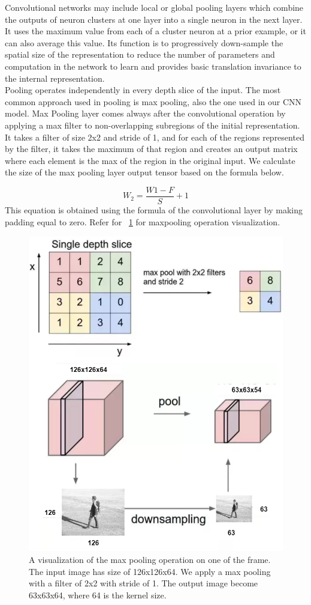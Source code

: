 Convolutional networks may include local or global pooling layers which combine the outputs of neuron clusters at one layer into a single neuron in the next layer. It uses the maximum value from each of a cluster neuron at a prior example, or it can also average this value. Its function is to progressively down-sample the spatial size of the representation to reduce the number of parameters and computation in the network to learn and provides basic translation invariance to the internal representation.\\

Pooling operates independently in every depth slice of the input. The most common approach used in pooling is max pooling, also the one used in our CNN model. Max Pooling layer comes always after the convolutional operation by applying a max filter to non-overlapping subregions of the initial representation. It takes a filter of size 2x2 and stride of 1, and for each of the regions represented by the filter, it takes the maximum of that region and creates an output matrix where each element is the max of the region in the original input. We calculate the size of the max pooling layer output tensor based on the formula below.

\begin{equation}
 W_{2}=\frac{W1-F}{S} +1
\end{equation}
This equation is obtained using the formula of the convolutional layer by making padding equal to zero. Refer for ~\ref{fig:maxpoolinglayervisualization} for maxpooling operation visualization.
\begin{figure}[ht]
\centering
\includegraphics[width=0.6\columnwidth]{Figures/mp3.png}
\decoRule
\caption[A visualization of the max pooling operation on one of the frame. The input image has size of 126x126x64. We apply a max pooling with a filter of 2x2 with stride of 1. The output image become 63x63x64, where 64 is the kernel size.]{A visualization of the max pooling operation on one of the frame. The input image has size of 126x126x64. We apply a max pooling with a filter of 2x2 with stride of 1. The output image become 63x63x64, where 64 is the kernel size.}
\label{fig:maxpoolinglayervisualization}
\end{figure}

